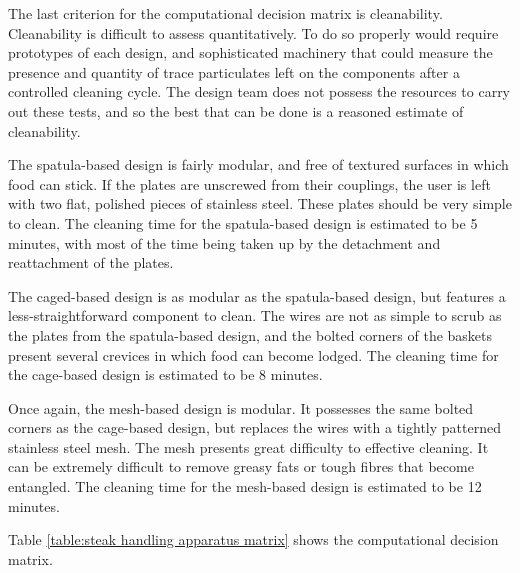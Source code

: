 \documentclass[11pt]{article}
\begin{document}
The last criterion for the computational decision matrix is cleanability.
Cleanability is difficult to assess quantitatively.
To do so properly would require prototypes of each design, and sophisticated machinery that could measure the presence and quantity of trace particulates left on the components after a controlled cleaning cycle.
The design team does not possess the resources to carry out these tests, and so the best that can be done is a reasoned estimate of cleanability.

The spatula-based design is fairly modular, and free of textured surfaces in which food can stick.
If the plates are unscrewed from their couplings, the user is left with two flat, polished pieces of stainless steel.
These plates should be very simple to clean.
The cleaning time for the spatula-based design is estimated to be 5 minutes, with most of the time being taken up by the detachment and reattachment of the plates.

The caged-based design is as modular as the spatula-based design, but features a less-straightforward component to clean.
The wires are not as simple to scrub as the plates from the spatula-based design, and the bolted corners of the baskets present several crevices in which food can become lodged.
The cleaning time for the cage-based design is estimated to be 8 minutes.

Once again, the mesh-based design is modular.
It possesses the same bolted corners as the cage-based design, but replaces the wires with a tightly patterned stainless steel mesh.
The mesh presents great difficulty to effective cleaning.
It can be extremely difficult to remove greasy fats or tough fibres that become entangled.
The cleaning time for the mesh-based design is estimated to be 12 minutes.

Table \ref{table:steak handling apparatus matrix} shows the computational decision matrix.
\end{document}
